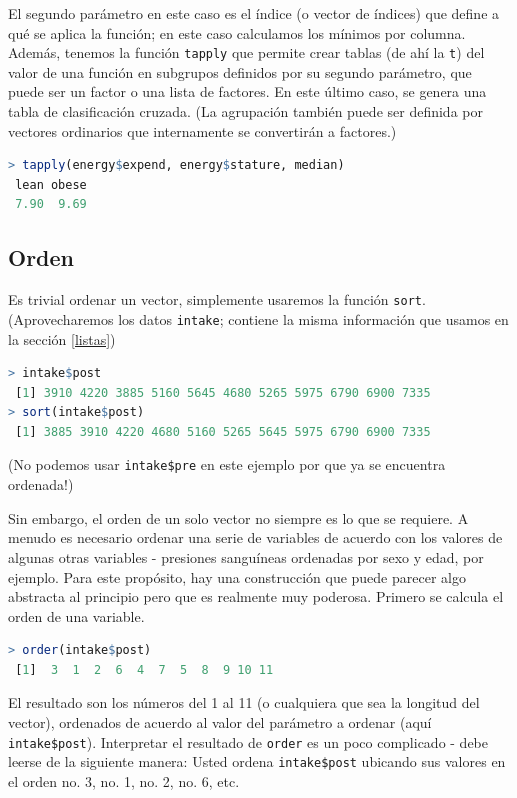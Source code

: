 El segundo parámetro en este caso es el índice (o vector de índices) que define
a qué se aplica la función; en este caso calculamos los mínimos por columna.
Además, tenemos la función \texttt{tapply} que permite crear tablas (de ahí la
\texttt{t}) del valor de una función en subgrupos definidos por su segundo
parámetro, que puede ser un factor o una lista de factores. En este último
caso, se genera una tabla de clasificación cruzada. (La agrupación también
puede ser definida por vectores ordinarios que internamente se convertirán a
factores.)

\begin{lstlisting}[language=R]
> tapply(energy$expend, energy$stature, median)
 lean obese
 7.90  9.69
\end{lstlisting}

\subsection{Orden}

Es trivial ordenar un vector, simplemente usaremos la función \texttt{sort}.
(Aprovecharemos los datos \texttt{intake}; contiene la misma información que
usamos en la sección \ref{listas})

\begin{lstlisting}[language=R]
> intake$post
 [1] 3910 4220 3885 5160 5645 4680 5265 5975 6790 6900 7335
> sort(intake$post)
 [1] 3885 3910 4220 4680 5160 5265 5645 5975 6790 6900 7335
\end{lstlisting}

(No podemos usar \texttt{intake\$pre} en este ejemplo por que ya se encuentra
ordenada!)

Sin embargo, el orden de un solo vector no siempre es lo que se
requiere. A menudo es necesario ordenar una serie de variables de acuerdo con
los valores de algunas otras variables - presiones sanguíneas ordenadas por
sexo y edad, por ejemplo. Para este propósito, hay una construcción que puede
parecer algo abstracta al principio pero que es realmente muy poderosa. Primero
se calcula el orden de una variable.

\begin{lstlisting}[language=R]
> order(intake$post)
 [1]  3  1  2  6  4  7  5  8  9 10 11
\end{lstlisting}

El resultado son los números del 1 al 11 (o cualquiera que sea la longitud del
vector), ordenados de acuerdo al valor del parámetro a ordenar (aquí
\texttt{intake\$post}). Interpretar el resultado de \texttt{order} es un poco
complicado - debe leerse de la siguiente manera: Usted ordena \texttt{intake\$post}
ubicando sus valores en el orden no. 3, no. 1, no. 2, no. 6, etc.

